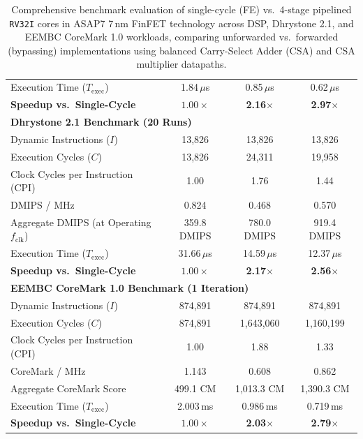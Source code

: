 \begin{table}[htbp]
{\begin{tabular}{|l|c|c|c|}
Execution Time ($T_{\text{exec}}$)          & 1.84\,$\mu$s      & 0.85\,$\mu$s      & 0.62\,$\mu$s \\
\textbf{Speedup vs.\ Single-Cycle}          & $1.00\times$      & \textbf{2.16$\times$} & \textbf{2.97$\times$} \\
\hline
\multicolumn{4}{|l|}{\textbf{Dhrystone 2.1 Benchmark (20 Runs)}} \\
\hline
Dynamic Instructions ($I$)                  & 13,826            & 13,826            & 13,826 \\
Execution Cycles ($C$)                      & 13,826            & 24,311            & 19,958 \\
Clock Cycles per Instruction (CPI)          & 1.00              & 1.76              & 1.44 \\
DMIPS / MHz                                 & 0.824             & 0.468             & 0.570 \\
Aggregate DMIPS (at Operating $f_{\text{clk}}$) & 359.8 DMIPS   & 780.0 DMIPS       & 919.4 DMIPS \\
Execution Time ($T_{\text{exec}}$)          & 31.66\,$\mu$s     & 14.59\,$\mu$s     & 12.37\,$\mu$s \\
\textbf{Speedup vs.\ Single-Cycle}          & $1.00\times$      & \textbf{2.17$\times$} & \textbf{2.56$\times$} \\
\hline
\multicolumn{4}{|l|}{\textbf{EEMBC CoreMark 1.0 Benchmark (1 Iteration)}} \\
\hline
Dynamic Instructions ($I$)                  & 874,891           & 874,891           & 874,891 \\
Execution Cycles ($C$)                      & 874,891           & 1,643,060         & 1,160,199 \\
Clock Cycles per Instruction (CPI)          & 1.00              & 1.88              & 1.33 \\
CoreMark / MHz                              & 1.143             & 0.608             & 0.862 \\
Aggregate CoreMark Score                    & 499.1 CM          & 1,013.3 CM        & 1,390.3 CM \\
Execution Time ($T_{\text{exec}}$)          & 2.003\,ms         & 0.986\,ms         & 0.719\,ms \\
\textbf{Speedup vs.\ Single-Cycle}          & $1.00\times$      & \textbf{2.03$\times$} & \textbf{2.79$\times$} \\
\hline
\end{tabular}%
}
\caption{Comprehensive benchmark evaluation of single-cycle (FE) vs.\ 4-stage pipelined \texttt{RV32I} cores in ASAP7 7\,nm FinFET technology across DSP, Dhrystone 2.1, and EEMBC CoreMark 1.0 workloads, comparing unforwarded vs.\ forwarded (bypassing) implementations using balanced Carry-Select Adder (CSA) and CSA multiplier datapaths.}\label{tab:riscv_all_benchmarks}
\end{table}



